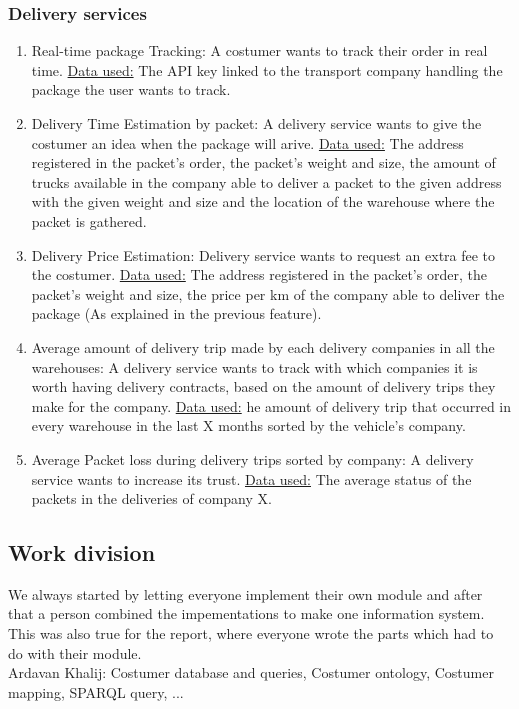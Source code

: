 \documentclass{article}
\begin{document}
\subsubsection{Delivery services}
\begin{enumerate}
  \item Real-time package Tracking: A costumer wants to track their order in real time. \underline{Data used:} The API key linked to the transport company handling the package the user wants to track.
  \item Delivery Time Estimation by packet: A delivery service wants to give the costumer an idea when the package will arive. \underline{Data used:} The address registered in the packet’s order, the packet’s weight and size, the amount of trucks available in the company able to deliver a packet to the given address with the given weight and size and the location of the warehouse where the packet is gathered.
  \item Delivery Price Estimation: Delivery service wants to request an extra fee to the costumer. \underline{Data used:} The address registered in the packet’s order, the packet’s weight and size, the price per km of the company able to deliver the package (As explained in the previous feature).
  \item Average amount of delivery trip made by each delivery companies in all the warehouses: A delivery service wants to track with which companies it is worth having delivery contracts, based on the amount of delivery trips they make for the company. \underline{Data used:} he amount of delivery trip that occurred in every warehouse in the last X months sorted by the vehicle’s company.
  \item Average Packet loss during delivery trips sorted by company: A delivery service wants to increase its trust. \underline{Data used:} The average status of the packets in the deliveries of company X.
\end{enumerate}


\subsection{Work division}
We always started by letting everyone implement their own module and after that a person combined the impementations to make one information system. This was also true for the report, where everyone wrote the parts which had to do with their module.  \\

\noindent Ardavan Khalij: Costumer database and queries, Costumer ontology, Costumer mapping, SPARQL query, ...
\\
\end{document}
